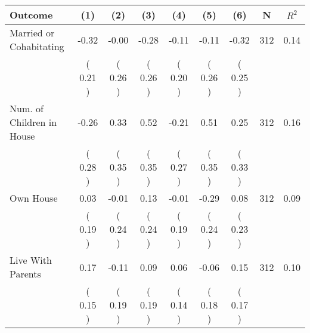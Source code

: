 \begin{tabular}{lcccccccc}
\toprule
 \textbf{Outcome} & \textbf{(1)} & \textbf{(2)} & \textbf{(3)} & \textbf{(4)} & \textbf{(5)} & \textbf{(6)} & \textbf{N} & \textbf{$ R^2$} \\
\midrule
Married or Cohabitating &     -0.32 &     -0.00 &     -0.28 &     -0.11 &     -0.11 &     -0.32 & 312 &       0.14 \\ 
 & (     0.21 ) & (     0.26 ) & (     0.26 ) & (     0.20 ) & (     0.26 ) & (     0.25 ) & \\
Num. of Children in House &     -0.26 &      0.33 &      0.52 &     -0.21 &      0.51 &      0.25 & 312 &       0.16 \\ 
 & (     0.28 ) & (     0.35 ) & (     0.35 ) & (     0.27 ) & (     0.35 ) & (     0.33 ) & \\
Own House &      0.03 &     -0.01 &      0.13 &     -0.01 &     -0.29 &      0.08 & 312 &       0.09 \\ 
 & (     0.19 ) & (     0.24 ) & (     0.24 ) & (     0.19 ) & (     0.24 ) & (     0.23 ) & \\
Live With Parents &      0.17 &     -0.11 &      0.09 &      0.06 &     -0.06 &      0.15 & 312 &       0.10 \\ 
 & (     0.15 ) & (     0.19 ) & (     0.19 ) & (     0.14 ) & (     0.18 ) & (     0.17 ) & \\
\bottomrule
\end{tabular}
